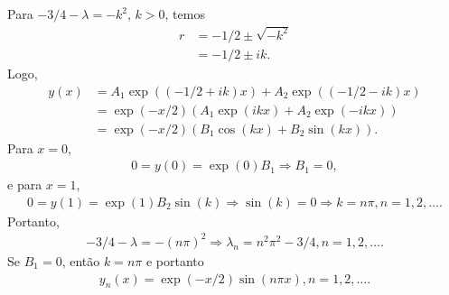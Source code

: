 \documentclass[a4paper,12pt, leqno, answers]{exam}
\begin{document}
\begin{questions}
\begin{parts}
\begin{solution}
            Para $-3/4 - \lambda = - k^2$, $k > 0$, temos
            \begin{align*}
                r &= -1/2 \pm \sqrt{-k^2} \\
                &= -1/2 \pm i k.
            \end{align*}
            Logo,
            \begin{align*}
                y(x) &= A_1 \exp\left( (-1/2 + ik) x \right) + A_2 \exp\left( (-1/2 - i k) x \right) \\
                &= \exp(-x/2) \left( A_1 \exp(i k x) + A_2 \exp(-i k x) \right) \\
                &= \exp(-x/2) \left( B_1 \cos(k x) + B_2 \sin(k x) \right).
            \end{align*}
            Para $x = 0$,
            \begin{align*}
                0 = y(0) = \exp(0) B_1 \Rightarrow B_1 = 0,
            \end{align*}
            e para $x = 1$,
            \begin{align*}
                0 = y(1) = \exp(1) B_2 \sin(k) \Rightarrow \sin(k) = 0 \Rightarrow k = n \pi, n = 1, 2, \ldots.
            \end{align*}
            Portanto,
            \begin{align*}
                -3/4 - \lambda = -(n \pi)^2 \Rightarrow \lambda_n = n^2 \pi^2 - 3/4, n = 1, 2, \ldots.
            \end{align*}
            Se $B_1 = 0$, ent\~{a}o $k = n \pi$ e portanto
            \begin{align*}
                y_n(x) = \exp(-x/2) \sin(n \pi x), n = 1, 2, \ldots.
            \end{align*}
        \end{solution}


\end{parts}
\end{questions}
\end{document}
